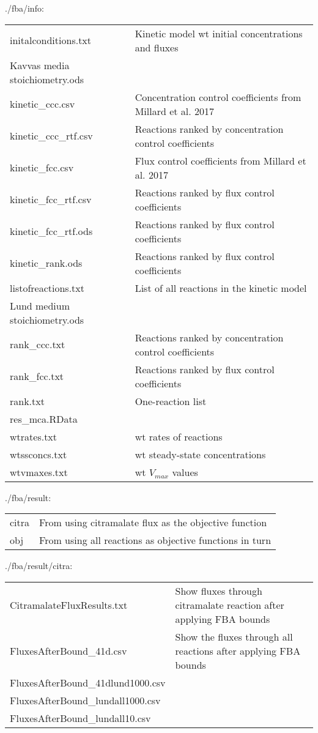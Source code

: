 \documentclass[a4paper, parskip=full]{scrreprt}
\begin{document}
./fba/info:

\begin{longtable}{ll}
initalconditions.txt & Kinetic model wt initial concentrations and fluxes\\
Kavvas media stoichiometry.ods\\
kinetic\_ccc.csv & Concentration control coefficients from Millard et al. 2017\\
kinetic\_ccc\_rtf.csv & Reactions ranked by concentration control coefficients\\
kinetic\_fcc.csv & Flux control coefficients from Millard et al. 2017\\
kinetic\_fcc\_rtf.csv & Reactions ranked by flux control coefficients\\
kinetic\_fcc\_rtf.ods & Reactions ranked by flux control coefficients\\
kinetic\_rank.ods & Reactions ranked by flux control coefficients\\
listofreactions.txt & List of all reactions in the kinetic model\\
Lund medium stoichiometry.ods\\
rank\_ccc.txt & Reactions ranked by concentration control coefficients\\
rank\_fcc.txt & Reactions ranked by flux control coefficients\\
rank.txt & One-reaction list\\
res\_mca.RData\\
wtrates.txt & wt rates of reactions\\
wtssconcs.txt & wt steady-state concentrations\\
wtvmaxes.txt & wt $V_{max}$ values
\end{longtable}

./fba/result:

\begin{longtable}{ll}
citra & From using citramalate flux as the objective function\\
obj & From using all reactions as objective functions in turn
\end{longtable}

./fba/result/citra:

\begin{longtable}{ll}
CitramalateFluxResults.txt & Show fluxes through citramalate reaction after applying FBA bounds\\
FluxesAfterBound\_41d.csv & Show the fluxes through all reactions after applying FBA bounds\\
FluxesAfterBound\_41dlund1000.csv\\
FluxesAfterBound\_lundall1000.csv\\
FluxesAfterBound\_lundall10.csv
\end{longtable}
\end{document}
